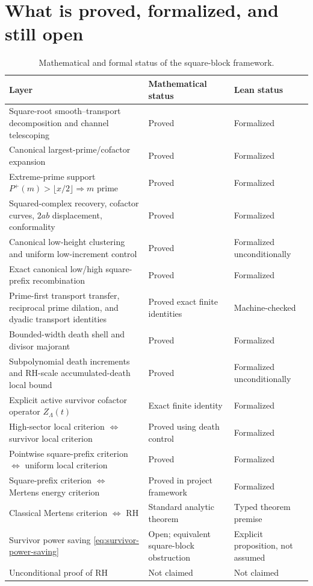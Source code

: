 \section{What is proved, formalized, and still open}
\label{sec:status}

\begin{table}[htbp]
\centering
\caption{Mathematical and formal status of the square-block framework.}
\label{tab:status}
\small
\renewcommand{\arraystretch}{1.20}
\begin{tabular}{>{\raggedright\arraybackslash}p{}
                >{\raggedright\arraybackslash}p{}
                >{\raggedright\arraybackslash}p{}}
\toprule
Layer & Mathematical status & Lean status\\
\midrule
Square-root smooth--transport decomposition and channel telescoping
& Proved & Formalized\\
Canonical largest-prime/cofactor expansion
& Proved & Formalized\\
Extreme-prime support $P^+(m)>\lfloor x/2\rfloor\Rightarrow m$ prime
& Proved & Formalized\\
Squared-complex recovery, cofactor curves, $2ab$ displacement, conformality
& Proved & Formalized\\
Canonical low-height clustering and uniform low-increment control
& Proved & Formalized unconditionally\\
Exact canonical low/high square-prefix recombination
& Proved & Formalized\\
Prime-first transport transfer, reciprocal prime dilation, and dyadic transport identities
& Proved exact finite identities & Machine-checked\\
Bounded-width death shell and divisor majorant
& Proved & Formalized\\
Subpolynomial death increments and RH-scale accumulated-death local bound
& Proved & Formalized unconditionally\\
Explicit active survivor cofactor operator $Z_\Lambda(t)$
& Exact finite identity & Formalized\\
High-sector local criterion $\Longleftrightarrow$ survivor local criterion
& Proved using death control & Formalized\\
Pointwise square-prefix criterion $\Longleftrightarrow$ uniform local criterion
& Proved & Formalized\\
Square-prefix criterion $\Longleftrightarrow$ Mertens energy criterion
& Proved in project framework & Formalized\\
Classical Mertens criterion $\Longleftrightarrow$ RH
& Standard analytic theorem & Typed theorem premise\\
Survivor power saving \cref{eq:survivor-power-saving}
& Open; equivalent square-block obstruction & Explicit proposition, not assumed\\
Unconditional proof of RH
& Not claimed & Not claimed\\
\bottomrule
\end{tabular}
\end{table}

